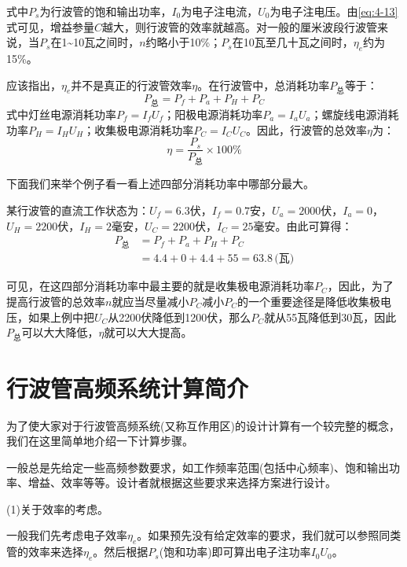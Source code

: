 式中$ P_s $为行波管的饱和输出功率，$ I_0 $为电子注电流，$ U_0 $为电子注电压。由\eqref{eq:4-13}式可见，增益参量$ C $越大，则行波管的效率就越高。对一般的厘米波段行波管来说，当$ P_s $在1\textasciitilde10瓦之间时，$ n $约略小于10\%；$ P_s $在10瓦至几十瓦之间时，$ \eta_e $约为15\%。


应该指出，$ \eta_e $并不是真正的行波管效率$ \eta $。在行波管中，总消耗功率$ P_\textrm{总} $等于：
\begin{equation*}
	P_\textrm{总} = P_f + P_a + P_H + P_C
\end{equation*}
式中灯丝电源消耗功率$ P_f = I_fU_f $；阳极电源消耗功率$ P_a = I_aU_a $；螺旋线电源消耗功率$ P_H = I_HU_H $；收集极电源消耗功率$ P_C = I_CU_C $。因此，行波管的总效率$ \eta $为：
\begin{equation} \label{eq:4-17}
	\eta = \frac{P_s}{P_\textrm{总}}\times 100\%
\end{equation}

下面我们来举个例子看一看上述四部分消耗功率中哪部分最大。

某行波管的直流工作状态为：$ U_f = 6.3 $伏，$ I_f = 0.7 $安，$ U_a = 2000 $伏，$ I_a = 0 $，$ U_H = 2200 $伏，$ I_H = 2 $毫安，$ U_C = 2200 $伏，$ I_C = 25 $毫安。由此可算得：
\begin{equation*}
	\begin{aligned}
	P_\textrm{总} &= P_f + P_a + P_H + P_C\\
	              &=4.4 + 0+ 4.4 + 55 =63.8\,\textrm{(瓦)}
	\end{aligned}
\end{equation*}

可见，在这四部分消耗功率中最主要的就是收集极电源消耗功率$ P_C $，因此，为了提高行波管的总效率$ n $就应当尽量减小$ P_C $减小$ P_C $的一个重要途径是降低收集极电压，如果上例中把$ U_C $从2200伏降低到1200伏，那么$ P_C $就从55瓦降低到30瓦，因此$ P_\textrm{总} $可以大大降低，$ \eta $就可以大大提高。


\section{行波管高频系统计算简介} 
为了使大家对于行波管高频系统(又称互作用区)的设计计算有一个较完整的概念，我们在这里简单地介绍一下计算步骤。


一般总是先给定一些高频参数要求，如工作频率范围(包括中心频率)、饱和输出功率、增益、效率等等。设计者就根据这些要求来选择方案进行设计。


(1)关于效率的考虑。

一般我们先考虑电子效率$ \eta_e $。如果预先没有给定效率的要求，我们就可以参照同类管的效率来选择$ \eta_e $。然后根据$ P_s $(饱和功率)即可算出电子注功率$ I_0U_0 $。

